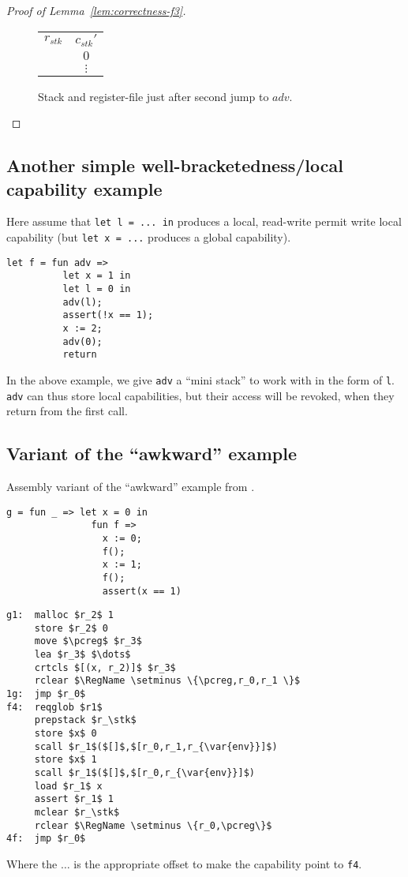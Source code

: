 \documentclass[a4paper]{article}
\newcommand{\var}[1]{\mathit{#1}}
\newcommand{\pcreg}{\mathrm{pc}}
\newcommand{\adv}{\var{adv}}
\newcommand{\stk}{\var{stk}}
\newcommand{\plaindom}[1]{\mathrm{#1}}
\newcommand{\RegName}{\plaindom{RegisterName}}
\begin{document}
\begin{lemma}
\begin{proof}[Proof of Lemma~\ref{lem:correctness-f3}]
\begin{enumproof}[start=3]
\begin{enumproof}[start=3]
\begin{figure}
\begin{tabular}{r |c |}
          \cline{2-2}
          $r_{\var{stk}}$  & $c_{\var{stk}}'$ \\
          \cline{2-2}
                   & $0$ \\
          \cline{2-2}
                   & $\vdots$ \\
          \cline{2-2}
        \end{tabular}
        \caption{Stack and register-file just after second jump to $\adv$.}
        \label{fig:f3-stack-before-snd-adv}
      \end{figure}
    \end{enumproof}
  \end{enumproof}
\end{proof}

\subsection{Another simple well-bracketedness/local capability example}
Here assume that \texttt{let l = ... in} produces a local, read-write permit write local capability (but \texttt{let x = ...} produces a global capability). 
\begin{verbatim}
let f = fun adv =>
          let x = 1 in
          let l = 0 in
          adv(l);
          assert(!x == 1);
          x := 2;
          adv(0);
          return
\end{verbatim}
In the above example, we give \texttt{adv} a ``mini stack'' to work with in the form of \texttt{l}. \texttt{adv} can thus store local capabilities, but their access will be revoked, when they return from the first call.

\subsection{Variant of the ``awkward'' example}
Assembly variant of the ``awkward'' example from \citep[p.~11]{Dreyer:2010:IHS:1863543.1863566}. 
\begin{verbatim}
g = fun _ => let x = 0 in
               fun f =>
                 x := 0;
                 f();
                 x := 1;
                 f();
                 assert(x == 1)
\end{verbatim}
\begin{lstlisting}
g1:  malloc $r_2$ 1
     store $r_2$ 0
     move $\pcreg$ $r_3$
     lea $r_3$ $\dots$
     crtcls $[(x, r_2)]$ $r_3$
     rclear $\RegName \setminus \{\pcreg,r_0,r_1 \}$
1g:  jmp $r_0$
f4:  reqglob $r1$
     prepstack $r_\stk$
     store $x$ 0
     scall $r_1$($[]$,$[r_0,r_1,r_{\var{env}}]$)
     store $x$ 1
     scall $r_1$($[]$,$[r_0,r_{\var{env}}]$)
     load $r_1$ x
     assert $r_1$ 1
     mclear $r_\stk$
     rclear $\RegName \setminus \{r_0,\pcreg\}$
4f:  jmp $r_0$
\end{lstlisting}
Where the $\dots$ is the appropriate offset to make the capability point to \texttt{f4}.



\end{lemma}
\end{document}
